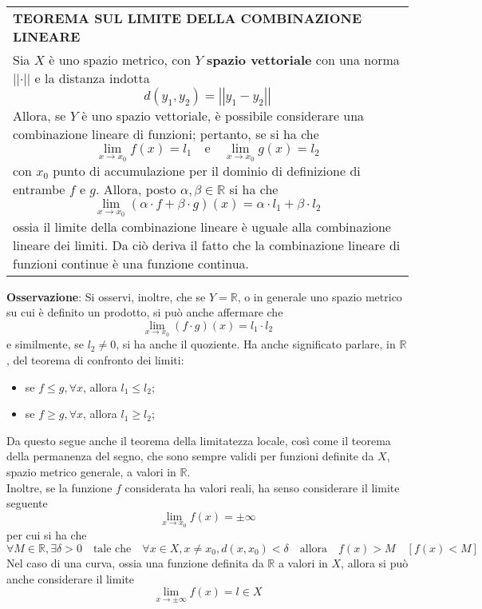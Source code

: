 \documentclass[a4paper]{extarticle}
\renewcommand\arraystretch{}
\begin{document}
\vspace{1em}
\setlength{\tabcolsep}{14pt}
\renewcommand{\arraystretch}{2}
\noindent
\begin{tabularx}{\textwidth}{@{}|P|@{}}
    \hline
    {\textbf{TEOREMA SUL LIMITE DELLA COMBINAZIONE LINEARE}}\\
    \parbox{\linewidth}{Sia $X$ è uno spazio metrico, con $Y$ \textbf{spazio vettoriale} con una norma $\vert \vert \cdot \vert \vert$ e la distanza indotta
    \[d(y_1,y_2) = \left \vert \left \vert y_1-y_2 \right \vert \right \vert\]
    Allora, se $Y$ è uno spazio vettoriale, è possibile considerare una combinazione lineare di funzioni; pertanto, se si ha che
    \[\lim_{x \to x_0} f(x) = l_1 \hspace{1em} \text{e} \hspace{1em} \lim_{x \to x_0} g(x) = l_2\]
    con $x_0$ punto di accumulazione per il dominio di definizione di entrambe $f$ e $g$. Allora, posto $\alpha, \beta \in \mathbb{R}$ si ha che
    \[\lim_{x \to x_0} \left(\alpha \cdot f + \beta \cdot g\right)(x) = \alpha \cdot l_1 + \beta \cdot l_2\]
    ossia il limite della combinazione lineare è uguale alla combinazione lineare dei limiti. Da ciò deriva il fatto che la combinazione lineare di funzioni continue è una funzione continua.\vspace{3mm}}\\
    \hline
\end{tabularx}

\vspace{2em}
\noindent
\textbf{Osservazione}: Si osservi, inoltre, che se $Y=\mathbb{R}$, o in generale uno spazio metrico su cui è definito un prodotto, si può anche affermare che
\[\lim_{x \to x_0} (f \cdot g)(x) = l_1 \cdot l_2\]
e similmente, se $l_2 \neq 0$, si ha anche il quoziente. Ha anche significato parlare, in $\mathbb{R}$, del teorema di confronto dei limiti:
\begin{itemize}
    \item se $f \leq g, \forall x$, allora $l_1 \leq l_2$;
    \item se $f \geq g, \forall x$, allora $l_1 \geq l_2$;
\end{itemize}
Da questo segue anche il teorema della limitatezza locale, così come il teorema della permanenza del segno, che sono sempre validi per funzioni definite da $X$, spazio metrico generale, a valori in $\mathbb{R}$.\\
Inoltre, se la funzione $f$ considerata ha valori reali, ha senso considerare il limite seguente
\[\lim_{x \to x_0} f(x) = \pm \infty\]
per cui si ha che
\[\forall M \in \mathbb{R}, \exists \delta > 0 \hspace{1em} \text{tale che} \hspace{1em} \forall x \in X, x \neq x_0, d(x,x_0)<\delta \hspace{1em} \text{allora} \hspace{1em} f(x) > M \hspace{1em} \left[f(x) < M\right]\]
Nel caso di una curva, ossia una funzione definita da $\mathbb{R}$ a valori in $X$, allora si può anche considerare il limite
\[\lim_{x \to \pm \infty} f(x) = l \in X\]
\end{document}
